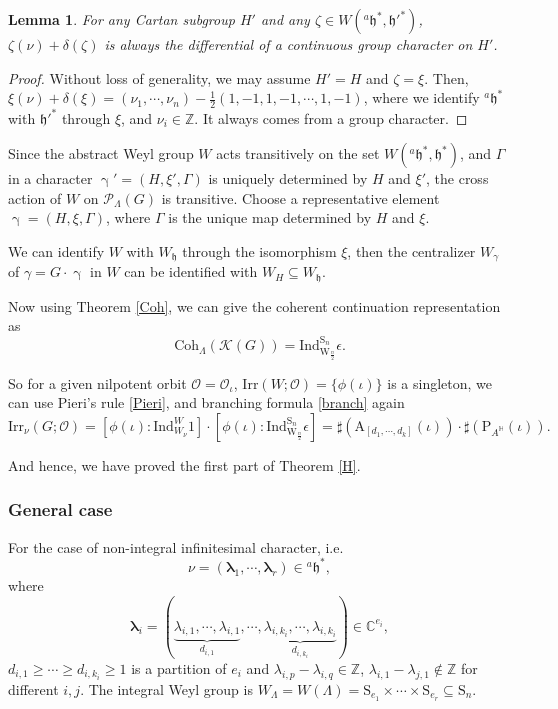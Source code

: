 \documentclass[12pt, a4paper]{amsart}
\numberwithin{equation}{section}
\newtheorem{lem}[thm]{Lemma}
\newcommand{\blam}{{\boldsymbol{\lambda}}}
\newcommand{\BC}{{\mathbb {C}}}
\newcommand{\BH}{{\mathbb {H}}}
\newcommand{\BZ}{{\mathbb {Z}}}
\newcommand{\CK}{{\mathcal {K}}}
\newcommand{\CO}{{\mathcal {O}}}
\newcommand{\CP}{{\mathcal {P}}}
\newcommand{\fh}{\mathfrak{h}}
\newcommand{\A}{{\mathrm{A}}}
\newcommand{\Ind}{{\mathrm{Ind}}}
\newcommand{\Irr}{{\mathrm{Irr}}}
\begin{document}
\begin{lem}
For any Cartan subgroup $H'$ and any $\zeta \in W({^{a}\fh^*,\fh'^*})$, $\zeta(\nu) + \delta(\zeta)$ is always the differential of a continuous group character on $H'$.
\end{lem}

\begin{proof}
    Without loss of generality, we may assume $H' = H$ and $\zeta = \xi$. Then, $\xi(\nu) + \delta(\xi) = (\nu_1,\cdots,\nu_n) - \frac{1}{2}(1,-1,1,-1,\cdots,1,-1)$, where we identify ${^{a}\fh^*}$ with $\fh'^*$ through $\xi$, and $\nu_i \in \BZ$. It always comes from a group character.
\end{proof}


Since the abstract Weyl group $W$ acts transitively on the set $W({^{a}\fh}^*,\fh^*)$, and $\Gamma$ in a character $\upgamma' = (H,\xi',\Gamma)$ is uniquely determined by $H$ and $\xi'$, the cross action of $W$ on $\CP_{\Lambda}(G)$ is transitive.  Choose a representative element $\upgamma = (H,\xi,\Gamma)$, where $\Gamma$ is the unique map determined by $H$ and $\xi$.

We can identify $W$ with $W_{\fh}$ through the isomorphism $\xi$, then the centralizer $W_{{\gamma}}$ of $\gamma = G \cdot \upgamma$ in $W$ can be identified with $W_{H} \subseteq W_{\fh}$.

Now using Theorem \ref{Coh}, we can give the coherent continuation representation as 
\begin{equation}
    \mathrm{Coh}_{\Lambda}(\CK(G)) = \Ind_{\mathrm{W}_{\frac{n}{2}}}^{\mathrm{S}_n} \epsilon.
\end{equation}

So for a given nilpotent orbit $\CO = \CO_{\iota}$, $\Irr(W;\CO) = \{\phi(\iota)\}$ is a singleton, we can use Pieri's rule \ref{Pieri}, and branching formula \ref{branch} again
\begin{equation}
    \Irr_{\nu}(G;\CO) = [\phi(\iota):\Ind_{W_\nu}^{W}1]\cdot[\phi(\iota): \Ind_{\mathrm{W}_{\frac{n}{2}}}^{\mathrm{S}_n}\epsilon] = \sharp(\A_{[d_1,\cdots,d_k]}(\iota))\cdot \sharp(\mathrm{P}_{A^\BH}(\iota)).
\end{equation}

And hence, we have proved the first part of Theorem \ref{H}.

\subsubsection{General case}
For the case of non-integral infinitesimal character, i.e. 
$$\nu = (\blam_1, \cdots, \blam_r) \in {^{a}\fh}^*,$$ 
where 
$$\blam_i = (\underbrace{\lambda_{i,1}, \cdots, \lambda_{i,1}}_{d_{i,1}},\cdots,\underbrace{\lambda_{i,k_i},\cdots,\lambda_{i,k_i}}_{d_{i,k_i}}) \in \BC^{e_i},$$ $d_{i,1} \geq \cdots \geq d_{i,k_i} \geq 1$ is a partition of $e_i$ and $\lambda_{i,p} - \lambda_{i,q} \in \BZ$, $\lambda_{i,1} - \lambda_{j,1} \notin \BZ$ for different $i,j$. The integral Weyl group is $W_{\Lambda} = W(\Lambda) = \mathrm{S}_{e_1} \times \cdots \times \mathrm{S}_{e_r} \subseteq \mathrm{S}_n$. 
\end{document}
